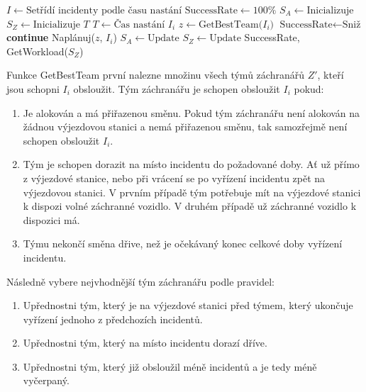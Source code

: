 \clearpage

\begin{algorithmic}[1]  %
	\State $I \gets \mbox{Setřídí incidenty podle času nastání}$
	\State $\text{SuccessRate} \gets 100\%$
	\State $S_A \gets \mbox{Inicializuje}$
	\State $S_Z \gets \mbox{Inicializuje}$
  \State $T$ 
    \State $T \gets \mbox{Čas nastání $I_i$}$
    \State $z \gets \mbox{GetBestTeam($I_i$)}$
      \State $\text{SuccessRate} \gets \mbox{Sniž}$
      \State \textbf{continue}
    \EndIf
    \State Naplánuj($z$, $I_i$)
    \State $S_A \gets \mbox{Update}$
    \State $S_Z \gets \mbox{Update}$
  \EndFor
  \State \Return SuccessRate, GetWorkload($S_Z$)
\EndFunction
\end{algorithmic}

\vspace*{25px}

Funkce GetBestTeam první nalezne množinu všech týmů záchranářů $Z'$, kteří jsou schopni $I_i$ obsloužit.
Tým záchranářu je schopen obsloužit $I_i$ pokud:

\begin{enumerate}
  \item Je alokován a má přiřazenou směnu. Pokud tým záchranářu není alokován na žádnou výjezdovou stanici a nemá přiřazenou směnu, tak samozřejmě není schopen obsloužit $I_i$.
  \item Tým je schopen dorazit na místo incidentu do požadované doby. Ať už přímo z výjezdové stanice, nebo při vrácení se po vyřízení incidentu zpět na výjezdovou stanici. 
    V prvním případě tým potřebuje mít na výjezdové stanici k dispozi volné záchranné vozidlo. V druhém případě už záchranné vozidlo k dispozici má.
  \item Týmu nekončí směna dřive, než je očekávaný konec celkové doby vyřízení incidentu.
\end{enumerate}

Následně vybere nejvhodnější tým záchranářu podle pravidel:

\begin{enumerate}
  \item Upřednostni tým, který je na výjezdové stanici před týmem, který ukončuje vyřízení jednoho z předchozích incidentů. 
  \item Upřednostni tým, který na místo incidentu dorazí dříve. 
  \item Upřednostni tým, který již obsloužil méně incidentů a je tedy méně vyčerpaný.
\end{enumerate}

